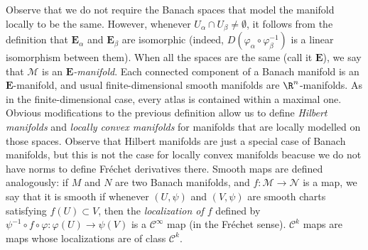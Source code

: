 Observe that we do not require the Banach spaces that model the manifold locally to be the same. However, whenever \(U_\alpha \cap U_\beta \neq \emptyset\), it follows from the definition that \(\mathbf{E}_\alpha\) and \(\mathbf{E}_\beta\) are isomorphic (indeed, \(D(\varphi_\alpha \circ \varphi_\beta^{-1})\) is a linear isomorphism between them). When all the spaces are the same (call it \(\mathbf{E}\)), we say that \(\mathcal{M}\) is an \textit{\(\mathbf{E}\)-manifold}. Each connected component of a Banach manifold is an \(\mathbf{E}\)-manifold, and usual finite-dimensional smooth manifolds are \(\R^n\)-manifolds. As in the finite-dimensional case, every atlas is contained within a maximal one. Obvious modifications to the previous definition allow us to define \textit{Hilbert manifolds} and \textit{locally convex manifolds} for manifolds that are locally modelled on those spaces. Observe that Hilbert manifolds are just a special case of Banach manifolds, but this is not the case for locally convex manifolds beacuse we do not have norms to define Fréchet derivatives there. Smooth maps are defined analogously: if \(M\) and \(N\) are two Banach manifolds, and \(f \colon \mathcal{M} \to \mathcal{N}\) is a map, we say that it is smooth if whenever \((U, \psi)\) and \((V, \psi)\) are smooth charts satisfying \(f(U) \subset V\), then the \textit{localization of \(f\)} defined by \(\psi^{-1}\circ f \circ \varphi\colon \varphi(U) \to \psi(V)\) is a \(\mathscr{C}^\infty\) map (in the Fréchet sense). \(\mathscr{C}^k\) maps are maps whose localizations are of class \(\mathscr{C}^k\). 


